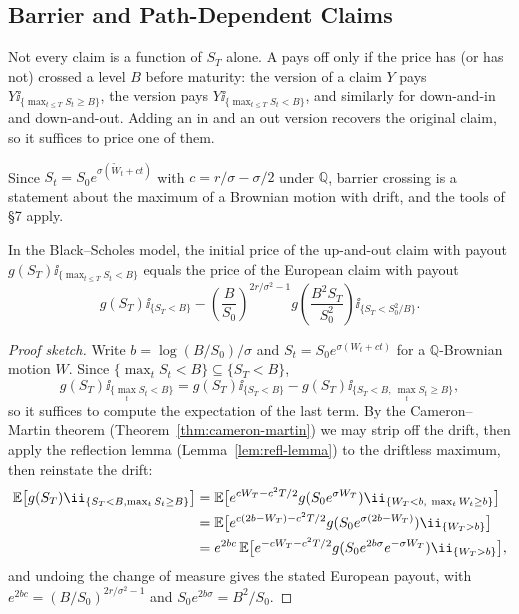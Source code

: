 \documentclass[a4paper]{scrartcl}
\newcommand{\QQ}{\mathbb{Q}}
\begin{document}
\subsection{Barrier and Path-Dependent Claims}

Not every claim is a function of $S_T$ alone. A  pays off only if the price has (or has not) crossed a level $B$ before maturity: the  version of a claim $Y$ pays $Y\ii_{\{\max_{t\leq T}S_t\geq B\}}$, the  version pays $Y\ii_{\{\max_{t\leq T}S_t < B\}}$, and similarly for down-and-in and down-and-out. Adding an in and an out version recovers the original claim, so it suffices to price one of them.

Since $S_t = S_0e^{\sigma(\tilde W_t + ct)}$ with $c = r/\sigma - \sigma/2$ under $\QQ$, barrier crossing is a statement about the maximum of a Brownian motion with drift, and the tools of \S7 apply.

\begin{proposition}
	In the Black--Scholes model, the initial price of the up-and-out claim with payout $g(S_T)\ii_{\{\max_{t\leq T}S_t < B\}}$ equals the price of the European claim with payout
	$$
	g(S_T)\ii_{\{S_T<B\}} - \left(\frac{B}{S_0}\right)^{2r/\sigma^2 - 1}g\!\left(\frac{B^2S_T}{S_0^2}\right)\ii_{\{S_T < S_0^2/B\}}.
	$$
\end{proposition}

\begin{proof}[Proof sketch]
	Write $b = \log(B/S_0)/\sigma$ and $S_t = S_0e^{\sigma(W_t + ct)}$ for a $\QQ$-Brownian motion $W$. Since $\{\max_t S_t < B\}\subseteq\{S_T<B\}$,
	$$
	g(S_T)\ii_{\{\max_t S_t<B\}} = g(S_T)\ii_{\{S_T<B\}} - g(S_T)\ii_{\{S_T<B,\ \max_tS_t\geq B\}},
	$$
	so it suffices to compute the expectation of the last term. By the Cameron--Martin theorem (Theorem~\ref{thm:cameron-martin}) we may strip off the drift, then apply the reflection lemma (Lemma~\ref{lem:refl-lemma}) to the driftless maximum, then reinstate the drift:
	\begin{align*}
		\EE\big[g(S_T)\ii_{\{S_T<B,\max_tS_t\geq B\}}\big] &= \EE\big[e^{cW_T - c^2T/2}g(S_0e^{\sigma W_T})\ii_{\{W_T<b,\ \max_tW_t\geq b\}}\big]\\
		&= \EE\big[e^{c(2b-W_T)-c^2T/2}g(S_0e^{\sigma(2b-W_T)})\ii_{\{W_T>b\}}\big]\\
		&= e^{2bc}\,\EE\big[e^{-cW_T-c^2T/2}g(S_0e^{2b\sigma}e^{-\sigma W_T})\ii_{\{W_T>b\}}\big],
	\end{align*}
	and undoing the change of measure gives the stated European payout, with $e^{2bc} = (B/S_0)^{2r/\sigma^2-1}$ and $S_0e^{2b\sigma} = B^2/S_0$.
\end{proof}
\end{document}
